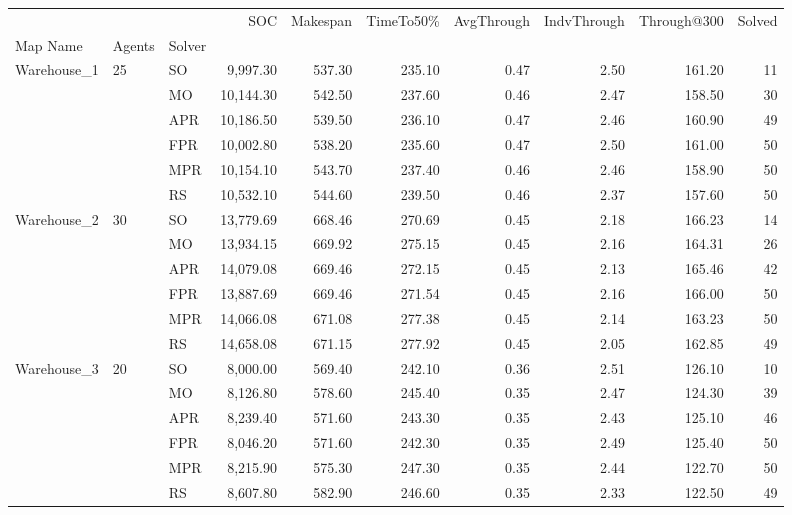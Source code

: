 \begin{tabular}{lllrrrrrrr}
\toprule
            &    &    &      SOC & Makespan & TimeTo50\% & AvgThrough & IndvThrough & Through@300 & Solved \\
Map Name & Agents & Solver &          &          &           &            &             &             &        \\
\midrule
Warehouse\_1 & 25 & SO &  9,997.30 &   537.30 &    235.10 &       0.47 &        2.50 &      161.20 &     11 \\
            &    & MO & 10,144.30 &   542.50 &    237.60 &       0.46 &        2.47 &      158.50 &     30 \\
            &    & APR & 10,186.50 &   539.50 &    236.10 &       0.47 &        2.46 &      160.90 &     49 \\
            &    & FPR & 10,002.80 &   538.20 &    235.60 &       0.47 &        2.50 &      161.00 &     50 \\
            &    & MPR & 10,154.10 &   543.70 &    237.40 &       0.46 &        2.46 &      158.90 &     50 \\
            &    & RS & 10,532.10 &   544.60 &    239.50 &       0.46 &        2.37 &      157.60 &     50 \\
            \hline
Warehouse\_2 & 30 & SO & 13,779.69 &   668.46 &    270.69 &       0.45 &        2.18 &      166.23 &     14 \\
            &    & MO & 13,934.15 &   669.92 &    275.15 &       0.45 &        2.16 &      164.31 &     26 \\
            &    & APR & 14,079.08 &   669.46 &    272.15 &       0.45 &        2.13 &      165.46 &     42 \\
            &    & FPR & 13,887.69 &   669.46 &    271.54 &       0.45 &        2.16 &      166.00 &     50 \\
            &    & MPR & 14,066.08 &   671.08 &    277.38 &       0.45 &        2.14 &      163.23 &     50 \\
            &    & RS & 14,658.08 &   671.15 &    277.92 &       0.45 &        2.05 &      162.85 &     49 \\
            \hline
Warehouse\_3 & 20 & SO &  8,000.00 &   569.40 &    242.10 &       0.36 &        2.51 &      126.10 &     10 \\
            &    & MO &  8,126.80 &   578.60 &    245.40 &       0.35 &        2.47 &      124.30 &     39 \\
            &    & APR &  8,239.40 &   571.60 &    243.30 &       0.35 &        2.43 &      125.10 &     46 \\
            &    & FPR &  8,046.20 &   571.60 &    242.30 &       0.35 &        2.49 &      125.40 &     50 \\
            &    & MPR &  8,215.90 &   575.30 &    247.30 &       0.35 &        2.44 &      122.70 &     50 \\
            &    & RS &  8,607.80 &   582.90 &    246.60 &       0.35 &        2.33 &      122.50 &     49 \\
\bottomrule
\end{tabular}
